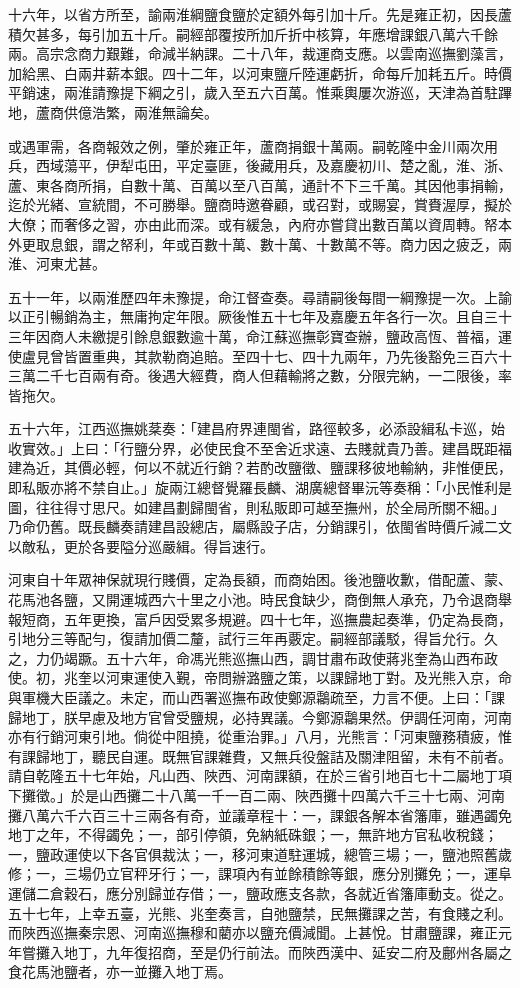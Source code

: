 \begin{pinyinscope}
十六年，以省方所至，諭兩淮綱鹽食鹽於定額外每引加十斤。先是雍正初，因長蘆積欠甚多，每引加五十斤。嗣經部覆按所加斤折中核算，年應增課銀八萬六千餘兩。高宗念商力艱難，命減半納課。二十八年，裁運商支應。以雲南巡撫劉藻言，加給黑、白兩井薪本銀。四十二年，以河東鹽斤陸運虧折，命每斤加耗五斤。時價平銷速，兩淮請豫提下綱之引，歲入至五六百萬。惟乘輿屢次游巡，天津為首駐蹕地，蘆商供億浩繁，兩淮無論矣。

或遇軍需，各商報效之例，肇於雍正年，蘆商捐銀十萬兩。嗣乾隆中金川兩次用兵，西域蕩平，伊犁屯田，平定臺匪，後藏用兵，及嘉慶初川、楚之亂，淮、浙、蘆、東各商所捐，自數十萬、百萬以至八百萬，通計不下三千萬。其因他事捐輸，迄於光緒、宣統間，不可勝舉。鹽商時邀眷顧，或召對，或賜宴，賞賚渥厚，擬於大僚；而奢侈之習，亦由此而深。或有緩急，內府亦嘗貸出數百萬以資周轉。帑本外更取息銀，謂之帑利，年或百數十萬、數十萬、十數萬不等。商力因之疲乏，兩淮、河東尤甚。

五十一年，以兩淮歷四年未豫提，命江督查奏。尋請嗣後每間一綱豫提一次。上諭以正引暢銷為主，無庸拘定年限。厥後惟五十七年及嘉慶五年各行一次。且自三十三年因商人未繳提引餘息銀數逾十萬，命江蘇巡撫彰寶查辦，鹽政高恆、普福，運使盧見曾皆置重典，其款勒商追賠。至四十七、四十九兩年，乃先後豁免三百六十三萬二千七百兩有奇。後遇大經費，商人但藉輸將之數，分限完納，一二限後，率皆拖欠。

五十六年，江西巡撫姚棻奏：「建昌府界連閩省，路徑較多，必添設緝私卡巡，始收實效。」上曰：「行鹽分界，必使民食不至舍近求遠、去賤就貴乃善。建昌既距福建為近，其價必輕，何以不就近行銷？若酌改鹽徵、鹽課移彼地輸納，非惟便民，即私販亦將不禁自止。」旋兩江總督覺羅長麟、湖廣總督畢沅等奏稱：「小民惟利是圖，往往得寸思尺。如建昌劃歸閩省，則私販即可越至撫州，於全局所關不細。」乃命仍舊。既長麟奏請建昌設總店，屬縣設子店，分銷課引，依閩省時價斤減二文以敵私，更於各要隘分巡嚴緝。得旨速行。

河東自十年眾神保就現行賤價，定為長額，而商始困。後池鹽收歉，借配蘆、蒙、花馬池各鹽，又開運城西六十里之小池。時民食缺少，商倒無人承充，乃令退商舉報短商，五年更換，富戶因受累多規避。四十七年，巡撫農起奏準，仍定為長商，引地分三等配勻，復請加價二釐，試行三年再覈定。嗣經部議駁，得旨允行。久之，力仍竭蹶。五十六年，命馮光熊巡撫山西，調甘肅布政使蔣兆奎為山西布政使。初，兆奎以河東運使入覲，帝問辦潞鹽之策，以課歸地丁對。及光熊入京，命與軍機大臣議之。未定，而山西署巡撫布政使鄭源鸘疏至，力言不便。上曰：「課歸地丁，朕早慮及地方官曾受鹽規，必持異議。今鄭源鸘果然。伊調任河南，河南亦有行銷河東引地。倘從中阻撓，從重治罪。」八月，光熊言：「河東鹽務積疲，惟有課歸地丁，聽民自運。既無官課雜費，又無兵役盤詰及關津阻留，未有不前者。請自乾隆五十七年始，凡山西、陜西、河南課額，在於三省引地百七十二屬地丁項下攤徵。」於是山西攤二十八萬一千一百二兩、陜西攤十四萬六千三十七兩、河南攤八萬六千六百三十三兩各有奇，並議章程十：一，課銀各解本省籓庫，雖遇蠲免地丁之年，不得蠲免；一，部引停領，免納紙硃銀；一，無許地方官私收稅錢；一，鹽政運使以下各官俱裁汰；一，移河東道駐運城，總管三場；一，鹽池照舊歲修；一，三場仍立官秤牙行；一，課項內有並餘積餘等銀，應分別攤免；一，運阜運儲二倉穀石，應分別歸並存借；一，鹽政應支各款，各就近省籓庫動支。從之。五十七年，上幸五臺，光熊、兆奎奏言，自弛鹽禁，民無攤課之苦，有食賤之利。而陜西巡撫秦宗恩、河南巡撫穆和藺亦以鹽充價減聞。上甚悅。甘肅鹽課，雍正元年嘗攤入地丁，九年復招商，至是仍行前法。而陜西漢中、延安二府及鄜州各屬之食花馬池鹽者，亦一並攤入地丁焉。


\end{pinyinscope}
